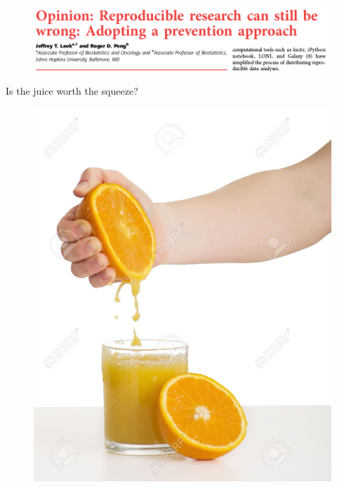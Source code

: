\documentclass[10pt]{beamer}\usepackage[]{graphicx}\usepackage[]{color}
\begin{document}
\begin{frame}
\begin{figure}[h!]
\centering
\includegraphics[scale=0.30, keepaspectratio]{./leek}
\end{figure}
\end{frame}




\begin{frame}{Is the juice worth the squeeze?}
\begin{figure}[h!]
\centering
\includegraphics[scale=0.40, keepaspectratio]{./juice}
\end{figure}
\end{frame}
\end{document}
